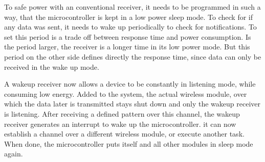 To safe power with an conventional receiver, it needs to be programmed in such a way, that the microcontroller is kept in a low power sleep mode.
To check for if any data was sent, it needs to wake up periodically to check for notifications.
To set this period is a trade off between response time and power consumption.
Is the period larger, the receiver is a longer time in its low power mode.
But this period on the other side defines directly the response time, since data can only be received in the wake up mode.

A wakeup receiver now allows a device to be constantly in listening mode, while consuming low energy.
Added to the system, the actual wireless module, over which the data later is transmitted stays shut down and only the wakeup receiver is listening.
After receiving a defined pattern over this channel, the wakeup receiver generates an interrupt to wake up the microcontroller. 
it can now establish a channel over a different wireless module, or execute another task.
When done, the microcontroller puts itself and all other modules in sleep mode again.

